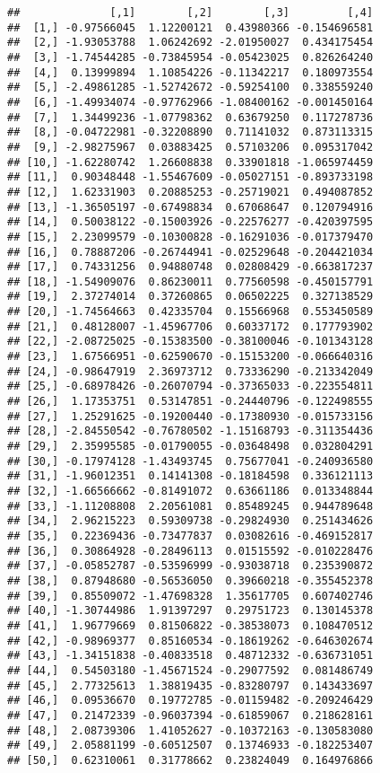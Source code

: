 \documentclass[]{article}
\begin{document}
\begin{verbatim}
##              [,1]        [,2]        [,3]         [,4]
##  [1,] -0.97566045  1.12200121  0.43980366 -0.154696581
##  [2,] -1.93053788  1.06242692 -2.01950027  0.434175454
##  [3,] -1.74544285 -0.73845954 -0.05423025  0.826264240
##  [4,]  0.13999894  1.10854226 -0.11342217  0.180973554
##  [5,] -2.49861285 -1.52742672 -0.59254100  0.338559240
##  [6,] -1.49934074 -0.97762966 -1.08400162 -0.001450164
##  [7,]  1.34499236 -1.07798362  0.63679250  0.117278736
##  [8,] -0.04722981 -0.32208890  0.71141032  0.873113315
##  [9,] -2.98275967  0.03883425  0.57103206  0.095317042
## [10,] -1.62280742  1.26608838  0.33901818 -1.065974459
## [11,]  0.90348448 -1.55467609 -0.05027151 -0.893733198
## [12,]  1.62331903  0.20885253 -0.25719021  0.494087852
## [13,] -1.36505197 -0.67498834  0.67068647  0.120794916
## [14,]  0.50038122 -0.15003926 -0.22576277 -0.420397595
## [15,]  2.23099579 -0.10300828 -0.16291036 -0.017379470
## [16,]  0.78887206 -0.26744941 -0.02529648 -0.204421034
## [17,]  0.74331256  0.94880748  0.02808429 -0.663817237
## [18,] -1.54909076  0.86230011  0.77560598 -0.450157791
## [19,]  2.37274014  0.37260865  0.06502225  0.327138529
## [20,] -1.74564663  0.42335704  0.15566968  0.553450589
## [21,]  0.48128007 -1.45967706  0.60337172  0.177793902
## [22,] -2.08725025 -0.15383500 -0.38100046 -0.101343128
## [23,]  1.67566951 -0.62590670 -0.15153200 -0.066640316
## [24,] -0.98647919  2.36973712  0.73336290 -0.213342049
## [25,] -0.68978426 -0.26070794 -0.37365033 -0.223554811
## [26,]  1.17353751  0.53147851 -0.24440796 -0.122498555
## [27,]  1.25291625 -0.19200440 -0.17380930 -0.015733156
## [28,] -2.84550542 -0.76780502 -1.15168793 -0.311354436
## [29,]  2.35995585 -0.01790055 -0.03648498  0.032804291
## [30,] -0.17974128 -1.43493745  0.75677041 -0.240936580
## [31,] -1.96012351  0.14141308 -0.18184598  0.336121113
## [32,] -1.66566662 -0.81491072  0.63661186  0.013348844
## [33,] -1.11208808  2.20561081  0.85489245  0.944789648
## [34,]  2.96215223  0.59309738 -0.29824930  0.251434626
## [35,]  0.22369436 -0.73477837  0.03082616 -0.469152817
## [36,]  0.30864928 -0.28496113  0.01515592 -0.010228476
## [37,] -0.05852787 -0.53596999 -0.93038718  0.235390872
## [38,]  0.87948680 -0.56536050  0.39660218 -0.355452378
## [39,]  0.85509072 -1.47698328  1.35617705  0.607402746
## [40,] -1.30744986  1.91397297  0.29751723  0.130145378
## [41,]  1.96779669  0.81506822 -0.38538073  0.108470512
## [42,] -0.98969377  0.85160534 -0.18619262 -0.646302674
## [43,] -1.34151838 -0.40833518  0.48712332 -0.636731051
## [44,]  0.54503180 -1.45671524 -0.29077592  0.081486749
## [45,]  2.77325613  1.38819435 -0.83280797  0.143433697
## [46,]  0.09536670  0.19772785 -0.01159482 -0.209246429
## [47,]  0.21472339 -0.96037394 -0.61859067  0.218628161
## [48,]  2.08739306  1.41052627 -0.10372163 -0.130583080
## [49,]  2.05881199 -0.60512507  0.13746933 -0.182253407
## [50,]  0.62310061  0.31778662  0.23824049  0.164976866
\end{verbatim}
\end{document}
